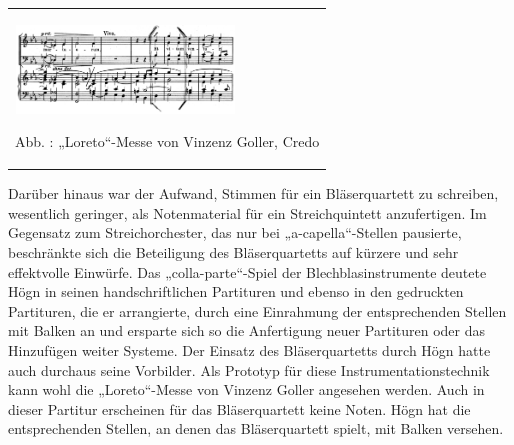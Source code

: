 \begin{flushleft}
\tablefirsthead{}
\tablehead{}
\tabletail{}
\tablelasttail{}
\begin{supertabular}{m{6.019cm}}

\begin{center}

\includegraphics[width=5.837cm,height=2.35cm]{pictures/zulassungsarbeit-img075.png}

\end{center}
Abb. : „Loreto“-Messe von Vinzenz Goller,
Credo\\
\end{supertabular}
\end{flushleft}
Darüber hinaus war der Aufwand, Stimmen für ein Bläserquartett zu
schreiben, wesentlich geringer, als Notenmaterial für ein
Streichquintett anzufertigen. Im Gegensatz zum Streichorchester, das
nur bei „a-capella“-Stellen pausierte, beschränkte sich die Beteiligung
des Bläserquartetts auf kürzere und sehr effektvolle Einwürfe. Das
„colla-parte“-Spiel der Blechblasinstrumente deutete Högn in seinen
handschriftlichen Partituren und ebenso in den gedruckten Partituren,
die er arrangierte, durch eine Einrahmung der entsprechenden Stellen
mit Balken an und ersparte sich so die Anfertigung neuer Partituren
oder das Hinzufügen weiter Systeme. Der Einsatz des Bläserquartetts
durch Högn hatte auch durchaus seine Vorbilder. Als Prototyp für diese
Instrumentationstechnik kann wohl die „Loreto“-Messe von Vinzenz Goller
angesehen werden. Auch in dieser Partitur erscheinen für das
Bläserquartett keine Noten. Högn hat die entsprechenden Stellen, an
denen das Bläserquartett spielt, mit Balken versehen.

